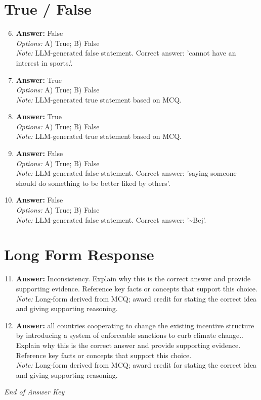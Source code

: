 \documentclass[12pt]{article}
\begin{document}
\section*{True / False}
\begin{enumerate}[label=\arabic*.]
\setcounter{enumi}{5}
\item \textbf{Answer:} False
\\ \textit{Options:} A) True; B) False
\\ \textit{Note:} LLM-generated false statement. Correct answer: 'cannot have an interest in sports.'.
\item \textbf{Answer:} True
\\ \textit{Options:} A) True; B) False
\\ \textit{Note:} LLM-generated true statement based on MCQ.
\item \textbf{Answer:} True
\\ \textit{Options:} A) True; B) False
\\ \textit{Note:} LLM-generated true statement based on MCQ.
\item \textbf{Answer:} False
\\ \textit{Options:} A) True; B) False
\\ \textit{Note:} LLM-generated false statement. Correct answer: 'saying someone should do something to be better liked by others'.
\item \textbf{Answer:} False
\\ \textit{Options:} A) True; B) False
\\ \textit{Note:} LLM-generated false statement. Correct answer: '\textasciitilde{}Bej'.
\end{enumerate}

\section*{Long Form Response}
\begin{enumerate}[label=\arabic*.]
\setcounter{enumi}{10}
\item \textbf{Answer:} Inconsistency. Explain why this is the correct answer and provide supporting evidence. Reference key facts or concepts that support this choice.
\\ \textit{Note:} Long-form derived from MCQ; award credit for stating the correct idea and giving supporting reasoning.
\item \textbf{Answer:} all countries cooperating to change the existing incentive structure by introducing a system of enforceable sanctions to curb climate change.. Explain why this is the correct answer and provide supporting evidence. Reference key facts or concepts that support this choice.
\\ \textit{Note:} Long-form derived from MCQ; award credit for stating the correct idea and giving supporting reasoning.
\end{enumerate}

\vfill
\noindent\textit{End of Answer Key}
\end{document}
